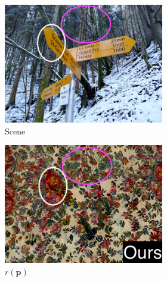 \begin{figure}[ht]
\begin{subfigure}{\textwidth}
        \begin{subfigure}{0.3\textwidth}
            \centering
            \includegraphics[width=\textwidth]{images/01-results_teaser-bg_highlighted.jpg}
            \caption{Scene}
            \label{fig:intro_results_teaser_bg}
        \end{subfigure}
        \hfill
        \begin{subfigure}{0.3\textwidth}
            \centering
            \includegraphics[width=\textwidth]{images/01-results_teaser-stats_proj_highlighted2.jpg}
            \caption{\(r(\bm{p})\)}
            \label{fig:intro_results_teaser_stats_proj}
        \end{subfigure}
        \hfill
        \begin{subfigure}{0.3\textwidth}

\end{subfigure}
\end{subfigure}
\end{figure}
